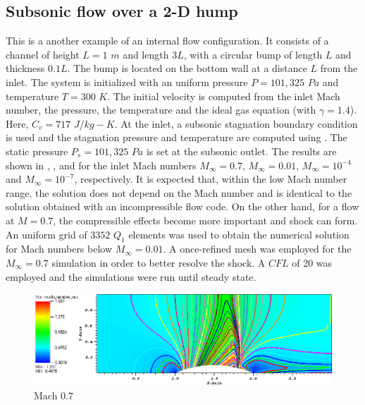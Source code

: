 \subsection{Subsonic flow over a 2-D hump} \label{sec:hump}
This is a another example of an internal flow configuration. It consists of a channel of height $L=1$ $m$ and length $3L$, with a circular bump of length $L$ and thickness $0.1L$. The bump is located on the bottom wall at a distance $L$ from the inlet. The system is initialized with an uniform pressure $P=101,325$ $Pa$ and temperature $T=300$ $K$. The initial velocity is computed from the inlet Mach number, the pressure, the temperature and the ideal gas equation (with  $\gamma=1.4$). Here,  $C_v = 717$ $J/kg-K$. At the inlet, a subsonic stagnation boundary condition is used and the stagnation pressure and temperature are computed using .
The static pressure $P_s = 101,325$ $Pa$ is set at the subsonic outlet. The results are shown in , ,  and  for the inlet Mach numbers $M_{\infty}=0.7$, $M_{\infty}=0.01$, $M_{\infty}=10^{-4}$ and $M_{\infty}=10^{-7}$, respectively. It is expected that, within the low Mach number range, the solution does not depend on the Mach number and is identical to the solution obtained with an incompressible flow code. On the other hand, for a flow at $M=0.7$, the compressible effects become more important and shock can form. An uniform grid of $3352$ $Q_1$ elements was used to obtain the numerical solution for Mach numbers below $M_{\infty}=0.01$. A once-refined mesh was employed for the $M_{\infty}=0.7$ simulation in order to better resolve the shock. A $CFL$ of 20 was employed and the simulations were run until steady state.
%
        \begin{figure}[H]
                \centering
                \includegraphics[width=\textwidth]{figures/Hump2D_mach_0p7.png}
                \caption{Mach $0.7$}
                \label{fig:2d_hump_mach_0p7}
        \end{figure}%

